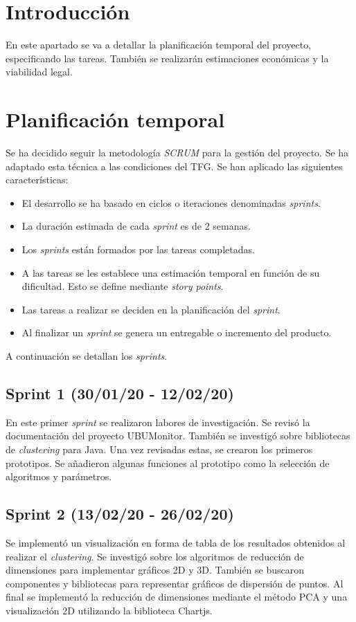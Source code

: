 
\section{Introducción}
En este apartado se va a detallar la planificación temporal del proyecto, especificando las tareas. También se realizarán estimaciones económicas y la viabilidad legal.

\section{Planificación temporal}
Se ha decidido seguir la metodología \emph{SCRUM} para la gestión del proyecto. Se ha adaptado esta técnica a las condiciones del TFG. Se han aplicado las siguientes características:
\begin{itemize}
	\item El desarrollo se ha basado en ciclos o iteraciones denominadas \emph{sprints}.
	\item La duración estimada de cada \emph{sprint} es de 2 semanas.
	\item Los \emph{sprints} están formados por las tareas completadas.
	\item A las tareas se les establece una estimación temporal en función de su dificultad. Esto se define mediante \emph{story points}.
	\item Las tareas a realizar se deciden en la planificación del \emph{sprint}.
	\item Al finalizar un \emph{sprint} se genera un entregable o incremento del producto.
\end{itemize}
A continuación se detallan los \emph{sprints}.

\subsection{Sprint 1 (30/01/20 - 12/02/20)}
En este primer \emph{sprint} se realizaron labores de investigación. Se revisó la documentación del proyecto UBUMonitor. También se investigó sobre bibliotecas de \emph{clustering} para Java. Una vez revisadas estas, se crearon los primeros prototipos. Se añadieron algunas funciones al prototipo como la selección de algoritmos y parámetros.

\subsection{Sprint 2 (13/02/20 - 26/02/20)}
Se implementó un visualización en forma de tabla de los resultados obtenidos al realizar el \emph{clustering}. Se investigó sobre los algoritmos de reducción de dimensiones para implementar gráficos 2D y 3D. También se buscaron componentes y bibliotecas para representar gráficos de dispersión de puntos. Al final se implementó la reducción de dimensiones mediante el método PCA y una visualización 2D utilizando la biblioteca Chartjs.


